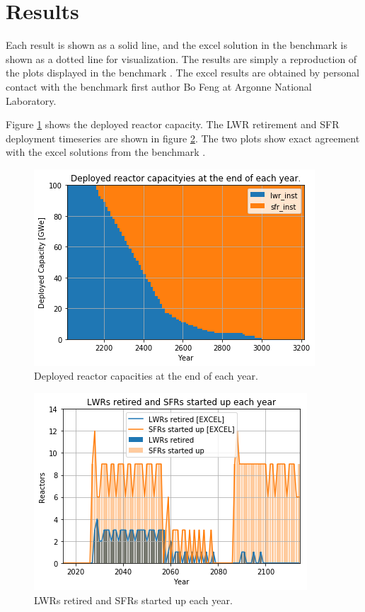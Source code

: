 \section{Results}

Each \Cyclus result is shown as a solid line, and the excel solution in the
benchmark \cite{feng_standardized_2016} is shown as a dotted line for visualization. The results are
simply a reproduction of the plots displayed in the benchmark \cite{feng_standardized_2016}. The excel
results are obtained by personal contact with the benchmark \cite{feng_standardized_2016} first author
Bo Feng at Argonne National Laboratory.


Figure \ref{fig:pow_plot} shows the deployed reactor capacity.
The \gls{LWR} retirement and \gls{SFR} deployment timeseries are shown
in figure \ref{fig:dep}. The two plots show exact agreement with the
excel solutions from the benchmark \cite{feng_standardized_2016}.

\begin{figure}[htbp!]
	\begin{center}
		\includegraphics[scale=0.5]{./images/results_18/power_plot.png}
	\end{center}
        \caption{Deployed reactor capacities at the end of each year.}
	\label{fig:pow_plot}
\end{figure}



\begin{figure}[htbp!]
	\begin{center}
		\includegraphics[scale=0.5]{./images/results_18/dep.png}
	\end{center}
        \caption{\glspl{LWR} retired and \glspl{SFR} started up each year.}
	\label{fig:dep}
\end{figure}


